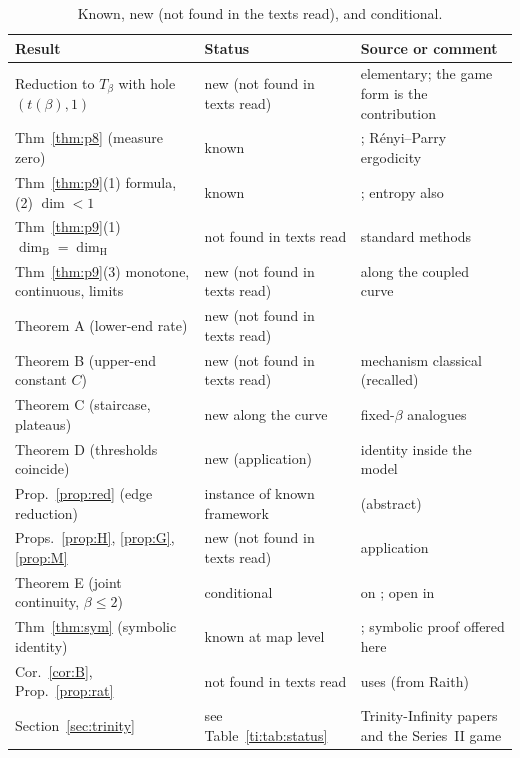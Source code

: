 \documentclass[11pt]{amsart}
\theoremstyle{remark}
\newcommand{\dimH}{\dim_{\mathrm H}}
\newcommand{\dimB}{\dim_{\mathrm B}}
\begin{document}
\begin{table}[h]
\centering\small
\begin{tabular}{p{4.2cm}p{3.6cm}p{6.2cm}}
\toprule
Result & Status & Source or comment\\
\midrule
Reduction to $T_\beta$ with hole $(t(\beta),1)$ & new (not found in texts read) & elementary; the game form is the contribution\\
Thm~\ref{thm:p8} (measure zero) & known & \cite[Prop.~2.5]{LSZ}; R\'enyi--Parry ergodicity\\
Thm~\ref{thm:p9}(1) formula, (2) $\dim<1$ & known & \cite[Thm.~1.2, Lemma~2.7, Prop.~2.5]{LSZ}; entropy also \cite[Thm.~4.3]{KLX}\\
Thm~\ref{thm:p9}(1) $\dimB=\dimH$ & not found in texts read & standard methods\\
Thm~\ref{thm:p9}(3) monotone, continuous, limits & new (not found in texts read) & along the coupled curve\\
Theorem A (lower-end rate) & new (not found in texts read) & \\
Theorem B (upper-end constant $C$) & new (not found in texts read) & mechanism classical (recalled)\\
Theorem C (staircase, plateaus) & new along the curve & fixed-$\beta$ analogues \cite{SLD,AKplat}\\
Theorem D (thresholds coincide) & new (application) & identity inside the model\\
Prop.~\ref{prop:red} (edge reduction) & instance of known framework & \cite{BK14} (abstract)\\
Props.~\ref{prop:H}, \ref{prop:G}, \ref{prop:M} & new (not found in texts read) & application\\
Theorem E (joint continuity, $\beta\le2$) & conditional & on \cite[Thm.~1.4]{LSZ}; open in \cite{AKcrit,AKgen}\\
Thm~\ref{thm:sym} (symbolic identity) & known at map level & \cite{Oliveira}; symbolic proof offered here\\
Cor.~\ref{cor:B}, Prop.~\ref{prop:rat} & not found in texts read & uses \cite[Lemma~6.2]{AKgen} (from Raith)\\
Section~\ref{sec:trinity} & see Table~\ref{ti:tab:status} & Trinity-Infinity papers and the Series~II game\\
\bottomrule
\end{tabular}
\caption{Known, new (not found in the texts read), and conditional.}
\end{table}
\end{document}
